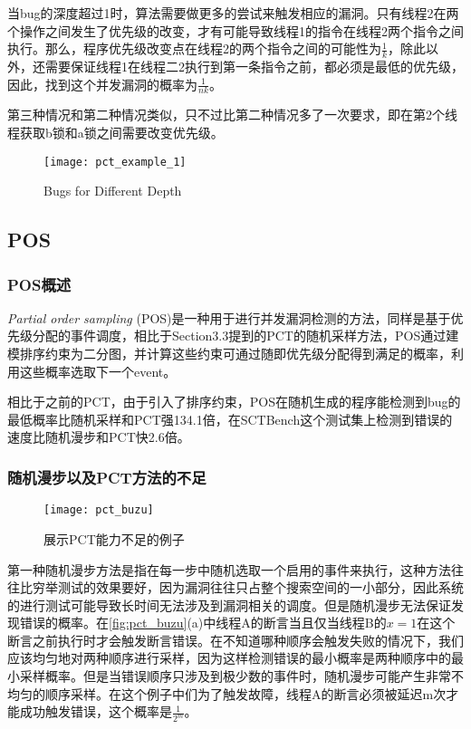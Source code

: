 当bug的深度超过1时，算法需要做更多的尝试来触发相应的漏洞。只有线程2在两个操作之间发生了优先级的改变，才有可能导致线程1的指令在线程2两个指令之间执行。那么，程序优先级改变点在线程2的两个指令之间的可能性为$\frac{1}{k}$，除此以外，还需要保证线程1在线程二2执行到第一条指令之前，都必须是最低的优先级，因此，找到这个并发漏洞的概率为$\frac{1}{nk}$。

第三种情况和第二种情况类似，只不过比第二种情况多了一次要求，即在第2个线程获取b锁和a锁之间需要改变优先级。

\begin{figure}[ht]
    \centering
    \texttt{[image: pct\_example\_1]}
    \caption{\label{fig:pct_example}Bugs for Different Depth}
\end{figure}

\subsection{POS}

\subsubsection{POS概述}

\textit{Partial order sampling} (POS)是一种用于进行并发漏洞检测的方法，同样是基于优先级分配的事件调度，相比于Section3.3提到的PCT的随机采样方法，POS通过建模排序约束为二分图，并计算这些约束可通过随即优先级分配得到满足的概率，利用这些概率选取下一个event。

相比于之前的PCT，由于引入了排序约束，POS在随机生成的程序能检测到bug的最低概率比随机采样和PCT强134.1倍，在SCTBench这个测试集上检测到错误的速度比随机漫步和PCT快2.6倍。

\subsubsection{随机漫步以及PCT方法的不足}

\begin{figure}[ht]
    \centering
    \texttt{[image: pct\_buzu]}
    \caption{\label{fig:pct_buzu}展示PCT能力不足的例子}
\end{figure}

第一种随机漫步方法是指在每一步中随机选取一个启用的事件来执行，这种方法往往比穷举测试的效果要好，因为漏洞往往只占整个搜索空间的一小部分，因此系统的进行测试可能导致长时间无法涉及到漏洞相关的调度。但是随机漫步无法保证发现错误的概率。在\autoref{fig:pct_buzu}(a)中线程A的断言当且仅当线程B的$x = 1$在这个断言之前执行时才会触发断言错误。在不知道哪种顺序会触发失败的情况下，我们应该均匀地对两种顺序进行采样，因为这样检测错误的最小概率是两种顺序中的最小采样概率。但是当错误顺序只涉及到极少数的事件时，随机漫步可能产生非常不均匀的顺序采样。在这个例子中们为了触发故障，线程A的断言必须被延迟m次才能成功触发错误，这个概率是$\frac{1}{2^m}$。

